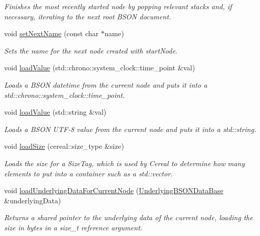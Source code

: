 \begin{DoxyCompactItemize}
\begin{DoxyCompactList}\small\item\em Finishes the most recently started node by popping relevant stacks and, if necessary, iterating to the next root B\+S\+ON document. \end{DoxyCompactList}\item 
void \hyperlink{classboson_1_1BSONInputArchive_a44b7425ce3516845419979d6ebb8d937}{set\+Next\+Name} (const char $\ast$name)
\begin{DoxyCompactList}\small\item\em Sets the name for the next node created with start\+Node. \end{DoxyCompactList}\item 
void \hyperlink{classboson_1_1BSONInputArchive_accadfb4603da988aabd74fe722925049}{load\+Value} (std\+::chrono\+::system\+\_\+clock\+::time\+\_\+point \&val)
\begin{DoxyCompactList}\small\item\em Loads a B\+S\+ON datetime from the current node and puts it into a std\+::chrono\+::system\+\_\+clock\+::time\+\_\+point. \end{DoxyCompactList}\item 
void \hyperlink{classboson_1_1BSONInputArchive_ad5006693c84badc5db0a32e24f2fbfa5}{load\+Value} (std\+::string \&val)
\begin{DoxyCompactList}\small\item\em Loads a B\+S\+ON U\+T\+F-\/8 value from the current node and puts it into a std\+::string. \end{DoxyCompactList}\item 
void \hyperlink{classboson_1_1BSONInputArchive_aea6822f9991c6d61cd98af62180e231d}{load\+Size} (cereal\+::size\+\_\+type \&size)
\begin{DoxyCompactList}\small\item\em Loads the size for a Size\+Tag, which is used by Cereal to determine how many elements to put into a container such as a std\+::vector. \end{DoxyCompactList}\item 
void \hyperlink{classboson_1_1BSONInputArchive_a3721f67c5f16330743940516d00217ee}{load\+Underlying\+Data\+For\+Current\+Node} (\hyperlink{classboson_1_1UnderlyingBSONDataBase}{Underlying\+B\+S\+O\+N\+Data\+Base} \&underlying\+Data)\hypertarget{classboson_1_1BSONInputArchive_a3721f67c5f16330743940516d00217ee}{}\label{classboson_1_1BSONInputArchive_a3721f67c5f16330743940516d00217ee}

\begin{DoxyCompactList}\small\item\em Returns a shared pointer to the underlying data of the current node, loading the size in bytes in a size\+\_\+t reference argument. \end{DoxyCompactList}\end{DoxyCompactItemize}



